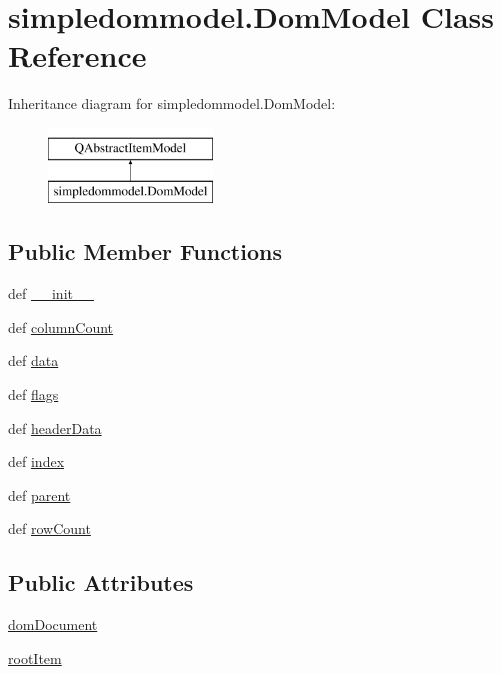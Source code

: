 \hypertarget{classsimpledommodel_1_1DomModel}{}\section{simpledommodel.\+Dom\+Model Class Reference}
\label{classsimpledommodel_1_1DomModel}
Inheritance diagram for simpledommodel.\+Dom\+Model\+:\begin{figure}[H]
\begin{center}
\leavevmode
\includegraphics[height=2.000000cm]{classsimpledommodel_1_1DomModel}
\end{center}
\end{figure}
\subsection*{Public Member Functions}
\begin{DoxyCompactItemize}
\item 
def \hyperlink{classsimpledommodel_1_1DomModel_a3b43f1265a08d38dff19128e4bbad342}{\+\_\+\+\_\+init\+\_\+\+\_\+}
\item 
def \hyperlink{classsimpledommodel_1_1DomModel_a588e6a542998dc291a3de17cbe54011d}{column\+Count}
\item 
def \hyperlink{classsimpledommodel_1_1DomModel_ab215aabc574e931c4d0f8f710d16eb93}{data}
\item 
def \hyperlink{classsimpledommodel_1_1DomModel_a4f9d4fc73662c602bded7b4d4af8204c}{flags}
\item 
def \hyperlink{classsimpledommodel_1_1DomModel_acf3c67a05da989e7e3e85bd51df01c1b}{header\+Data}
\item 
def \hyperlink{classsimpledommodel_1_1DomModel_aa2fc22daeb62ac3eb1943180a66da941}{index}
\item 
def \hyperlink{classsimpledommodel_1_1DomModel_a57bda5318eead18955297bee4d4c67d2}{parent}
\item 
def \hyperlink{classsimpledommodel_1_1DomModel_ab2b17c63b3631ac497d25630bfd03259}{row\+Count}
\end{DoxyCompactItemize}
\subsection*{Public Attributes}
\begin{DoxyCompactItemize}
\item 
\hyperlink{classsimpledommodel_1_1DomModel_ad070abf4f0830206494123449c8bd3f3}{dom\+Document}
\item 
\hyperlink{classsimpledommodel_1_1DomModel_a242cb2fd1c8372e25c63c667041594d2}{root\+Item}
\end{DoxyCompactItemize}


